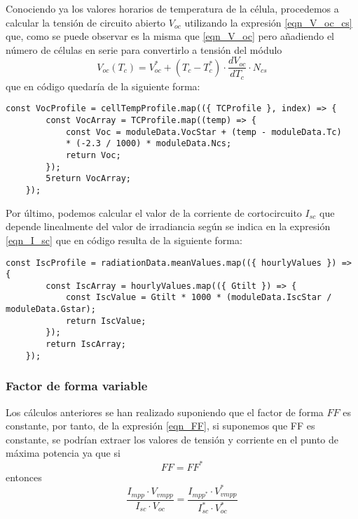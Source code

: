 Conociendo ya los valores horarios de temperatura de la célula, procedemos a calcular la tensión de circuito abierto $V_{oc}$ utilizando la expresión \ref{eqn_V_oc_cs} que, como se puede observar es la misma que \ref{eqn_V_oc} pero añadiendo el número de células en serie para convertirlo a tensión del módulo
\begin{equation}
\label{eqn_V_oc_cs}
V_{oc}(T_c) = V_{oc}^* + (T_c - T_c^*) \cdot \frac{dV_{oc}}{dT_c} \cdot N_{cs}
\end{equation}
que en código quedaría de la siguiente forma:
\begin{lstlisting}[style=ES6, caption={Cálculo de la tensión de circuito abierto}]
	const VocProfile = cellTempProfile.map(({ TCProfile }, index) => {
		const VocArray = TCProfile.map((temp) => {
			const Voc = moduleData.VocStar + (temp - moduleData.Tc) 
			* (-2.3 / 1000) * moduleData.Ncs;
			return Voc;
		});
		5return VocArray;
	});

\end{lstlisting}
\newpage
Por último, podemos calcular el valor de la corriente de cortocircuito $I_{sc}$ que depende linealmente del valor de irradiancia según se indica en la expresión \ref{eqn_I_sc} que en código resulta de la siguiente forma:

\begin{lstlisting}[style=ES6, caption={Cálculo de la corriente de cortocircuito}]
	const IscProfile = radiationData.meanValues.map(({ hourlyValues }) => {
		const IscArray = hourlyValues.map(({ Gtilt }) => {
			const IscValue = Gtilt * 1000 * (moduleData.IscStar / moduleData.Gstar);
			return IscValue;
		});
		return IscArray;
	});
\end{lstlisting}

\subsubsection{Factor de forma variable}

Los cálculos anteriores se han realizado suponiendo que el factor de forma $FF$ es constante, por tanto, de la expresión \ref{eqn_FF}, si suponemos que FF es constante, se podrían extraer los valores de tensión y corriente en el punto de máxima potencia ya que si
\begin{equation}
FF = FF^*
\end{equation}
entonces
\begin{equation}
\frac{I_{mpp} \cdot V_{vmpp}}{I_{sc} \cdot V_{oc}} = \frac{I_{mpp^*} \cdot V_{vmpp}^*}{I_{sc}^* \cdot V_{oc}^*}
\end{equation}

